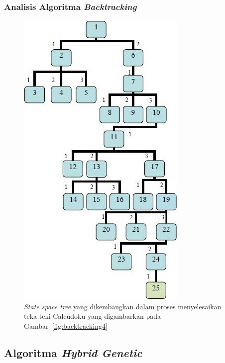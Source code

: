 \documentclass{beamer}
\begin{document}
\begin{frame}
\frametitle{Analisis Algoritma \textit{Backtracking}}
\begin{figure}
\centering
\captionsetup{justification=centering}
\includegraphics[scale=0.4]{Gambar/Backtracking8}
\caption[\textit{State space tree} yang dikembangkan dalam proses menyelesaikan teka-teki Calcudoku yang digambarkan pada Gambar~\ref{fig:backtracking4}]{\textit{State space tree} yang dikembangkan dalam proses menyelesaikan teka-teki Calcudoku yang digambarkan pada Gambar~\ref{fig:backtracking4}}
\label{fig:backtracking8}
\end{figure}
\end{frame}

\note{

}

\subsection{Algoritma \protect\textit{Hybrid Genetic}}
\end{document}
